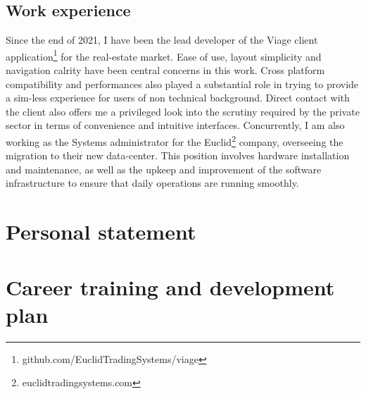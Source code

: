 \documentclass[journal,onecolumn]{IEEEtran}
\begin{document}
\subsection{Work experience} %
Since the end of 2021, I have been the lead developer of the Viage client application\footnote{github.com/EuclidTradingSystems/viage} for the real-estate market. Ease of use, layout simplicity and navigation calrity have been central concerns in this work. Cross platform compatibility and performances also played a substantial role in trying to provide a sim-less experience for users of non technical background. Direct contact with the client also offers me a privileged look into the scrutiny required by the private sector in terms of convenience and intuitive interfaces. Concurrently, I am also working as the Systems administrator for the Euclid\footnote{euclidtradingsystems.com} company, overseeing the migration to their new data-center. This position involves hardware installation and maintenance, as well as the upkeep and improvement of the software infrastructure to ensure that daily operations are running smoothly. 

\section{Personal statement} %

\section{Career training and development plan} %
\end{document}
